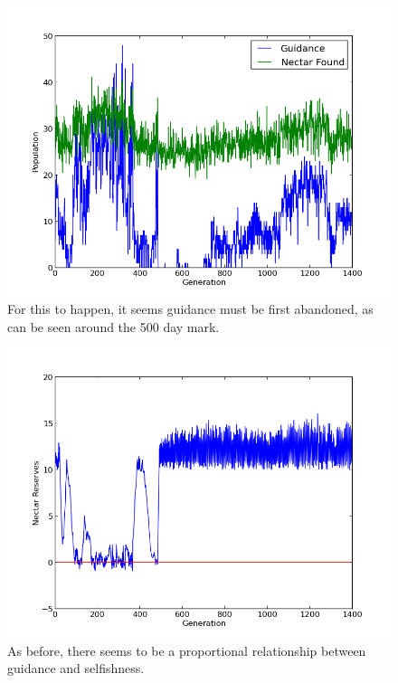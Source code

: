\documentclass[twoside]{article}
\begin{document}
\begin{multicols}{2}
                        \begin{figure}[H]
				\begin{center}
					\includegraphics[width=.5\textwidth]{results/gossip_alt_tell.png}
				\end{center}
                \caption{For this to happen, it seems guidance must be first abandoned, as can be seen around the 500 day mark.}
				\label{fig:altruistic_guidance}
			\end{figure}

			\begin{figure}[H]
				\begin{center}
					\includegraphics[width=.5\textwidth]{results/gossip_alt_res.png}
				\end{center}
                \caption{As before, there seems to be a proportional relationship between guidance and selfishness.}
				\label{fig:altruistic_reserves}
			\end{figure}



\end{multicols}
\end{document}
